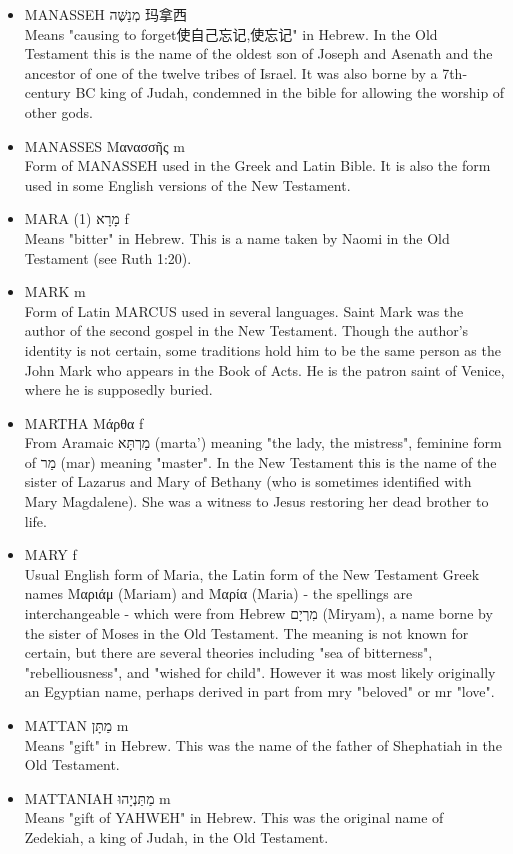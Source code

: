 \begin{itemize}
\item MANASSEH מְנַשֶּׁה 玛拿西\\
Means "causing to forget使自己忘记,使忘记" in Hebrew. In the Old Testament this is the name of the oldest son of Joseph and Asenath and the ancestor of one of the twelve tribes of Israel. It was also borne by a 7th-century BC king of Judah, condemned in the bible for allowing the worship of other gods.
\item MANASSES Μανασσῆς m \\
Form of MANASSEH used in the Greek and Latin Bible. It is also the form used in some English versions of the New Testament.
\item MARA (1) מָרָא f \\
Means "bitter" in Hebrew. This is a name taken by Naomi in the Old Testament (see Ruth 1:20).
\item MARK m \\
Form of Latin MARCUS used in several languages. Saint Mark was the author of the second gospel in the New Testament. Though the author's identity is not certain, some traditions hold him to be the same person as the John Mark who appears in the Book of Acts. He is the patron saint of Venice, where he is supposedly buried. 
\item MARTHA Μάρθα f \\
From Aramaic מַרְתָּא (marta') meaning "the lady, the mistress", feminine form of מַר (mar) meaning "master". In the New Testament this is the name of the sister of Lazarus and Mary of Bethany (who is sometimes identified with Mary Magdalene). She was a witness to Jesus restoring her dead brother to life.
\item MARY f \\
Usual English form of Maria, the Latin form of the New Testament Greek names Μαριάμ (Mariam) and Μαρία (Maria) - the spellings are interchangeable - which were from Hebrew מִרְיָם (Miryam), a name borne by the sister of Moses in the Old Testament. The meaning is not known for certain, but there are several theories including "sea of bitterness", "rebelliousness", and "wished for child". However it was most likely originally an Egyptian name, perhaps derived in part from mry "beloved" or mr "love".
\item MATTAN מַתָּן m \\
Means "gift" in Hebrew. This was the name of the father of Shephatiah in the Old Testament.
\item MATTANIAH מַתַּנְיָהוּ m \\
Means "gift of YAHWEH" in Hebrew. This was the original name of Zedekiah, a king of Judah, in the Old Testament.

\end{itemize}

